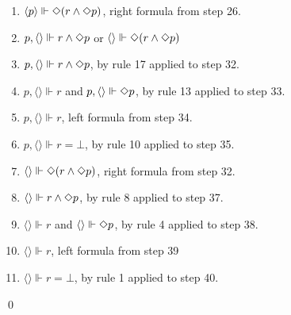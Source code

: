 \begin{myEx}
\begin{enumerate}
\item $\langle p \rangle \Vdash \Diamond(r \land \Diamond p)$, right formula from step 26.\\ %

\item $p, \langle \rangle \Vdash r \land \Diamond p$ or $\langle \rangle \Vdash \Diamond(r \land \Diamond p)$\\ %

\item $p, \langle \rangle \Vdash r \land \Diamond p$, by rule 17 applied to step 32.\\ %

\item $p, \langle \rangle \Vdash r$ and $p, \langle \rangle \Vdash \Diamond p$, by rule 13 applied to step 33.\\ %

\item $p, \langle \rangle \Vdash r$, left formula from step 34.\\ %

\item $p, \langle \rangle \Vdash r = \bot$, by rule 10 applied to step 35.\\ %

\item $\langle \rangle \Vdash \Diamond(r \land \Diamond p)$, right formula from step 32.\\ %

\item $\langle \rangle \Vdash r \land \Diamond p$, by rule 8 applied to step 37.\\ %
 
\item $\langle \rangle \Vdash r$ and $\langle \rangle \Vdash \Diamond p$, by rule 4 applied to step 38.\\ %

\item $\langle \rangle \Vdash r$, left formula from step 39\\ %

\item $\langle \rangle \Vdash r = \bot$, by rule 1 applied to step 40.\\%
\end{enumerate}
\qed
\end{myEx}